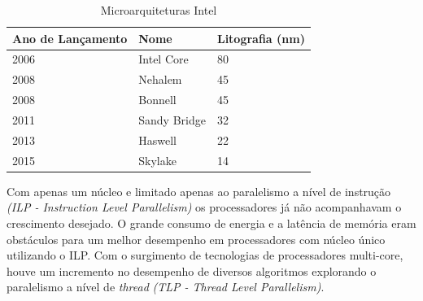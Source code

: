 \documentclass[conference]{IEEEtran}
\begin{document}
        \begin{table}[ht]
            \caption{Microarquiteturas Intel \cite{inteli5} \cite{inteli7}}
            \begin{center}
            \begin{tabular}{l|l|l}
                \hline
                Ano de Lançamento & Nome   & Litografia (nm) \\
                \hline
                2006 & Intel Core  & 80 \\
                \hline
                2008 & Nehalem  & 45 \\
                \hline
                2008 & Bonnell & 45\\
                \hline
                2011 & Sandy Bridge & 32\\
                \hline
                2013 & Haswell & 22\\
                \hline
                2015 & Skylake & 14\\
                \hline
                \end{tabular}
            \end{center}
            \label{tab:microarquitetura}
        \end{table}
                
        Com apenas um núcleo e limitado apenas ao paralelismo a nível de instrução \textit{(ILP - Instruction Level Parallelism)} os processadores já não acompanhavam o crescimento desejado. O grande consumo de energia e a latência de memória eram obstáculos para um melhor desempenho em processadores com núcleo único utilizando o ILP. Com o surgimento de tecnologias de processadores multi-core, houve um incremento no desempenho de diversos algoritmos explorando o paralelismo a nível de \textit{thread} \textit{(TLP - Thread Level Parallelism)}.
        
        
\end{document}
